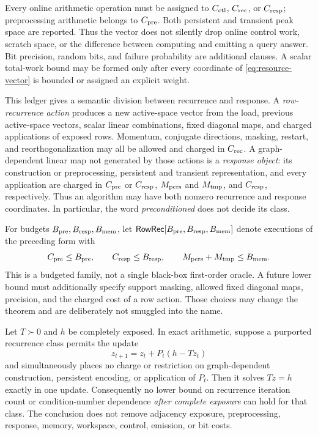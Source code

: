 Every online arithmetic operation must be assigned to $C_{\rm ctl}$,
$C_{\rm rec}$, or $C_{\rm resp}$; preprocessing arithmetic belongs to
$C_{\rm pre}$.  Both persistent and transient peak space are reported.  Thus
the vector does not silently drop online control work, scratch space, or the
difference between computing and emitting a query answer.  Bit precision,
random bits, and failure probability are additional clauses.  A scalar
total-work bound may be formed only after every coordinate of
\cref{eq:resource-vector} is bounded or assigned an explicit weight.

This ledger gives a semantic division between recurrence and response.  A
\emph{row-recurrence action} produces a new active-space vector from the load,
previous active-space vectors, scalar linear combinations, fixed diagonal
maps, and charged applications of exposed rows.  Momentum, conjugate
directions, masking, restart, and reorthogonalization may all be allowed and
charged in $C_{\rm rec}$.  A graph-dependent linear map not generated by those
actions is a \emph{response object}: its construction or preprocessing,
persistent and transient representation, and every application are charged in
$C_{\rm pre}$ or $C_{\rm resp}$, $M_{\rm pers}$ and $M_{\rm tmp}$, and
$C_{\rm resp}$, respectively.  Thus an algorithm may have both nonzero
recurrence and response coordinates.  In particular, the word
\emph{preconditioned} does not decide its class.

For budgets $B_{\rm pre},B_{\rm resp},B_{\rm mem}$, let
$\mathsf{RowRec}[B_{\rm pre},B_{\rm resp},B_{\rm mem}]$ denote executions of
the preceding form with
\[
 C_{\rm pre}\leq B_{\rm pre},\qquad
 C_{\rm resp}\leq B_{\rm resp},\qquad
 M_{\rm pers}+M_{\rm tmp}\leq B_{\rm mem}.
\]
This is a budgeted family, not a single black-box first-order oracle.  A future
lower bound must additionally specify support masking, allowed fixed diagonal
maps, precision, and the charged cost of a row action.  Those choices may
change the theorem and are deliberately not smuggled into the name.

\begin{lemma}
\label{lem:free-preconditioner-collapse}
Let $T\succ0$ and $h$ be completely exposed.  In exact arithmetic, suppose a
purported recurrence class permits the update
\begin{equation}
 z_{t+1}=z_t+P_t(h-Tz_t)
 \label{eq:preconditioned-residual-step}
\end{equation}
and simultaneously places no charge or restriction on graph-dependent
construction, persistent encoding, or application of $P_t$.  Then it solves
$Tz=h$ exactly in one update.  Consequently no lower bound on recurrence
iteration count or condition-number dependence \emph{after complete exposure}
can hold for that class.  The conclusion does not remove adjacency exposure,
preprocessing, response, memory, workspace, control, emission, or bit costs.
\end{lemma}

